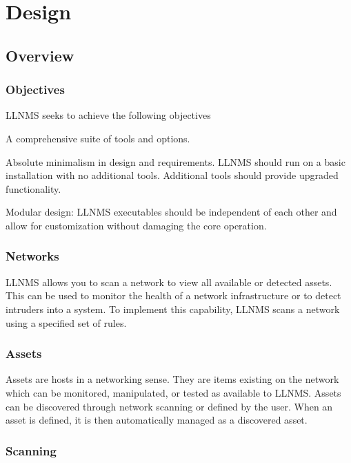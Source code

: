 \documentclass[12pt]{report}
\begin{document}
\section*{Design}

\subsection*{Overview}

\subsubsection*{Objectives}
LLNMS seeks to achieve the following objectives
\begin{declarative}
\item A comprehensive suite of tools and options.
\item Absolute minimalism in design and requirements.  LLNMS should run on a basic installation with no additional tools.  Additional tools should provide upgraded functionality.
\item [Modular design: ] LLNMS executables should be independent of each other and allow for customization without damaging the core operation. 
\end{declarative}

\subsubsection*{Networks}

LLNMS allows you to scan a network to view all available or detected assets.  This 
can be used to monitor the health of a network infrastructure or to detect intruders into
a system.  To implement this capability, LLNMS scans a network using a specified set of 
rules.  

\subsubsection*{Assets}

Assets are hosts in a networking sense.  They are items existing on the network which can be monitored, 
manipulated, or tested as available to LLNMS.  Assets can be discovered through network scanning or 
defined by the user.  When an asset is defined, it is then automatically managed as a discovered asset.

\subsubsection*{Scanning}
\end{document}
